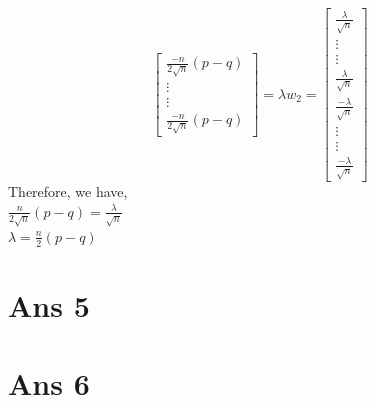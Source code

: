 \documentclass[10pt]{article}
\begin{document}
\begin{flushleft}
$$\begin{bmatrix}
\frac{-n}{2 \sqrt n} (p-q)\\
\vdots\\
\vdots\\
\frac{-n}{2 \sqrt n} (p-q)
\end{bmatrix}
= \lambda w_{2}
= \begin{bmatrix}
\frac{\lambda}{\sqrt n}\\
\vdots\\
\vdots\\
\frac{\lambda}{\sqrt n}\\
\frac{-\lambda}{\sqrt n}\\
\vdots\\
\vdots\\
\frac{-\lambda}{\sqrt n}
\end{bmatrix}
$$
Therefore, we have,\\
\vspace{0.5em}
$\frac{n}{2 \sqrt n} (p-q) = \frac{\lambda}{\sqrt n}$\\
\vspace{0.5em}
$\lambda = \frac{n}{2} (p-q)$
\end{flushleft}
\section*{Ans 5}
\begin{figure}[!htb]
    \begin{floatrow}
    \end{floatrow}
\end{figure}
\section*{Ans 6}
\begin{flushleft}

\end{flushleft}
\end{document}
